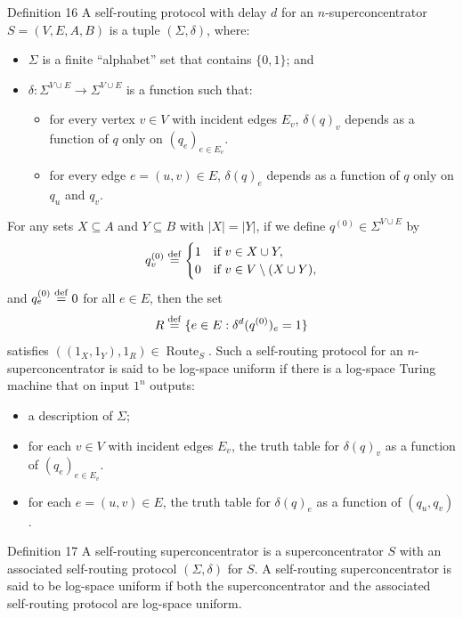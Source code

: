 \begin{originalresult}{Definition 16}
A self-routing protocol with delay $d$ for an $n$-superconcentrator $S=(V,E,A,B)$ is a tuple $(\Sigma,\delta)$, where:
\begin{itemize}
\item $\Sigma$ is a finite ``alphabet'' set that contains $\{0,1\}$; and
\item $\delta:\Sigma^{V\cup E}\to\Sigma^{V\cup E}$ is a function such that:
\begin{itemize}
\item for every vertex $v\in V$ with incident edges $E_v$, $\delta(q)_v$ depends as a function of $q$ only on $(q_e)_{e\in E_v}$.
\item for every edge $e=(u,v)\in E$, $\delta(q)_e$ depends as a function of $q$ only on $q_u$ and $q_v$.
\end{itemize}
\end{itemize}
For any sets $X\subseteq A$ and $Y\subseteq B$ with $|X|=|Y|$, if we define $q^{(0)}\in\Sigma^{V\cup E}$ by
\[q_v^{(0)}\stackrel{\rm def}=\begin{cases}1&\text{if }v\in X\cup Y,\\0&\text{if }v\in V\setminus(X\cup Y),\end{cases}\]
and $q_e^{(0)}\stackrel{\rm def}=0$ for all $e\in E$, then the set
\[R\stackrel{\rm def}=\{e\in E:\delta^d(q^{(0)})_e=1\}\]
satisfies $((1_X,1_Y),1_R)\in\operatorname{Route}_S$.
Such a self-routing protocol for an $n$-superconcentrator is said to be log-space uniform if there is a log-space Turing machine that on input $1^n$ outputs:
\begin{itemize}
\item a description of $\Sigma$;
\item for each $v\in V$ with incident edges $E_v$, the truth table for $\delta(q)_v$ as a function of $(q_e)_{e\in E_v}$.
\item for each $e=(u,v)\in E$, the truth table for $\delta(q)_e$ as a function of $(q_u,q_v)$.
\end{itemize}
\end{originalresult}
\begin{originalresult}{Definition 17}
A self-routing superconcentrator is a superconcentrator $S$ with an associated self-routing protocol $(\Sigma,\delta)$ for $S$. A self-routing superconcentrator is said to be log-space uniform if both the superconcentrator and the associated self-routing protocol are log-space uniform.
\end{originalresult}
